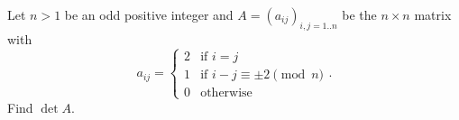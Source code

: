 Let \( n > 1\) be an odd positive integer and \( A = (a_{ij})_{i, j = 1..n}\) be the \( n \times n\) matrix with
\[ a_{ij}= \begin{cases}2 & \text{if }i = j \\ 1 & \text{if }i-j \equiv \pm 2 \pmod n \\ 0 & \text{otherwise}\end{cases}.\]
Find \( \det A\).
